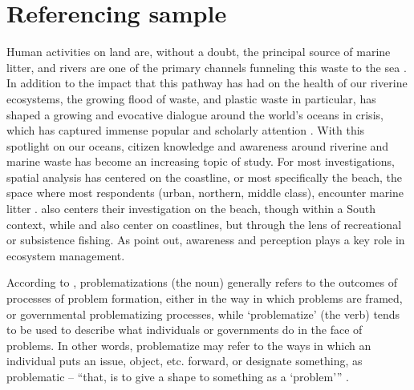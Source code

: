 \section{\label{sec:bib_sample}Referencing sample}

Human activities on land are, without a doubt, the principal source of marine litter, and rivers are one of the primary channels funneling this waste to the sea \citep{crosti_down_2018, emmerik_plastic_2020}. In addition to the impact that this pathway has had on the health of our riverine ecosystems, the growing flood of waste, and plastic waste in particular, has shaped a growing and evocative dialogue around the world’s oceans in crisis, which has captured immense popular and scholarly attention \citep[see][]{kalina_treating_2020, phelan_ocean_2020, stafford_viewpoint_2019}. With this spotlight on our oceans, citizen knowledge and awareness around riverine and marine waste has become an increasing topic of study. For most investigations, spatial analysis has centered on the coastline, or most specifically the beach, the space where most respondents (urban, northern, middle class), encounter marine litter \citep[see][]{locritani_assessing_2019, rayon-vina_marine_2018}. \citet{kusumawati_public_2018} also centers their investigation on the beach, though within a South context, while \citet{lewin_recreational_2020} and \citet{ferreira_organic_2020} also center on coastlines, but through the lens of recreational or subsistence fishing. As \citet{ferreira_organic_2020} point out, awareness and perception plays a key role in ecosystem management.

According to \citet{bacchi_turn_2015}, problematizations (the noun) generally refers to the outcomes of processes of problem formation, either in the way in which problems are framed, or governmental problematizing processes, while ‘problematize’ (the verb) tends to be used to describe what individuals or governments do in the face of problems. In other words, problematize may refer to the ways in which an individual puts an issue, object, etc. forward, or designate something, as problematic -- “that, is to give a shape to something as a ‘problem’” \citep[][p. 3]{bacchi_turn_2015}.
